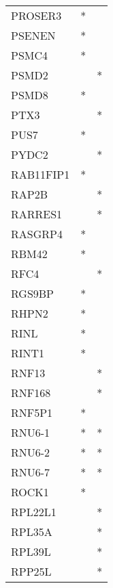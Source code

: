 \begin{longtable}{lcc}
PROSER3          &              * &            \\
PSENEN           &              * &            \\
PSMC4            &              * &            \\
PSMD2            &                &          * \\
PSMD8            &              * &            \\
PTX3             &                &          * \\
PUS7             &              * &            \\
PYDC2            &                &          * \\
RAB11FIP1        &              * &            \\
RAP2B            &                &          * \\
RARRES1          &                &          * \\
RASGRP4          &              * &            \\
RBM42            &              * &            \\
RFC4             &                &          * \\
RGS9BP           &              * &            \\
RHPN2            &              * &            \\
RINL             &              * &            \\
RINT1            &              * &            \\
RNF13            &                &          * \\
RNF168           &                &          * \\
RNF5P1           &              * &            \\
RNU6-1           &              * &          * \\
RNU6-2           &              * &          * \\
RNU6-7           &              * &          * \\
ROCK1            &              * &            \\
RPL22L1          &                &          * \\
RPL35A           &                &          * \\
RPL39L           &                &          * \\
RPP25L           &                &          * \\

\end{longtable}
